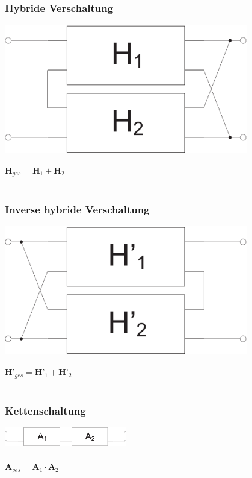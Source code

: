 \documentclass[a4paper,twocolumn,10pt]{article}
\begin{document}
\subsubsection*{Hybride Verschaltung}
\begin{minipage}[b]{0.23\textwidth}
\includegraphics[width=0.8\textwidth]{Grafiken/Zweitor_Hybrid}
\end{minipage}
\hfill
\begin{minipage}[b]{0.23\textwidth}
$\textbf{H}_{ges}=\textbf{H}_1+\textbf{H}_2$\\\\
\end{minipage}

\subsubsection*{Inverse hybride Verschaltung}
\begin{minipage}[b]{0.23\textwidth}
\includegraphics[width=0.8\textwidth]{Grafiken/Zweitor_inversHybrid}
\end{minipage}
\hfill
\begin{minipage}[b]{0.23\textwidth}
$\textbf{H'}_{ges}=\textbf{H'}_1+\textbf{H'}_2$\\\\
\end{minipage}

\subsubsection*{Kettenschaltung}
\includegraphics[width=0.4\textwidth]{Grafiken/Zweitor_Kette}\\\\
$\textbf{A}_{ges}=\textbf{A}_1\cdot \textbf{A}_2$
\end{document}
